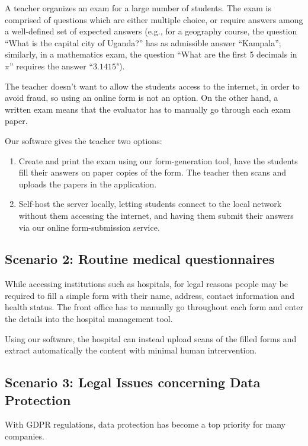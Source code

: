 \documentclass[11pt, a4paper]{report}
\begin{document}
A teacher organizes an exam for a large number of students.
The exam is comprised of questions which are either multiple choice, or require answers among a well-defined set of expected answers (e.g., for a geography course, the question ``What is the capital city of Uganda?'' has as admissible answer ``Kampala''; similarly, in a mathematics exam, the question ``What are the first 5 decimals in $\pi$'' requires the answer ``$3.1415$").

The teacher doesn't want to allow the students access to the internet, in order to avoid fraud, so using an online form is not an option. On the other hand, a written exam means that the evaluator has to manually go through each exam paper.

Our software gives the teacher two options:
\begin{enumerate}
    \item Create and print the exam using our form-generation tool, have the students fill their answers on paper copies of the form. The teacher then scans and uploads the papers in the application. 
    \item Self-host the server locally, letting students connect to the local network without them accessing the internet, and having them submit their answers via our online form-submission service.
\end{enumerate}

\subsection*{Scenario 2: Routine medical questionnaires}

While accessing institutions such as hospitals, for legal reasons people may be required to fill a simple form with their name, address, contact information and health status.
The front office has to manually go throughout each form and enter the details into the hospital management tool.

Using our software, the hospital can instead upload scans of the filled forms and extract automatically the content with minimal human intrervention.

\subsection*{Scenario 3:  Legal Issues concerning Data Protection}

With GDPR regulations, data protection has become a top priority for many companies.
\end{document}
